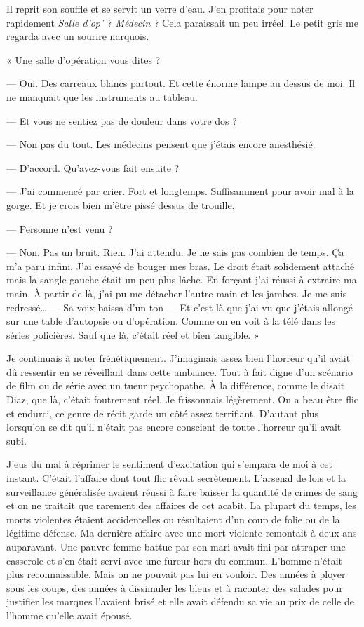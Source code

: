 Il reprit son souffle et se servit un verre d'eau. J'en profitais pour noter rapidement \emph{Salle d'op' ? Médecin ?}
Cela paraissait un peu irréel. Le petit gris me regarda avec un sourire narquois.

« Une salle d'opération vous dites ?

— Oui. Des carreaux blancs partout. Et cette énorme lampe au dessus de moi. Il ne manquait que les instruments au
tableau.

— Et vous ne sentiez pas de douleur dans votre dos ?

— Non pas du tout. Les médecins pensent que j'étais encore anesthésié.

— D'accord. Qu'avez-vous fait ensuite ?

— J'ai commencé par crier. Fort et longtemps. Suffisamment pour avoir mal à la gorge. Et je crois bien m'être pissé
dessus de trouille.

— Personne n'est venu ?

— Non. Pas un bruit. Rien. J'ai attendu. Je ne sais pas combien de temps. Ça m'a paru infini. J'ai essayé de bouger mes
bras. Le droit était solidement attaché mais la sangle gauche était un peu plus lâche. En forçant j'ai réussi à
extraire ma main. À partir de là, j'ai pu me détacher l'autre main et les jambes. Je me suis redressé… — Sa voix baissa
d'un ton — Et c'est là que j'ai vu que j'étais allongé sur une table d'autopsie ou d'opération. Comme on en voit à la
télé dans les séries policières. Sauf que là, c'était réel et bien tangible. »

Je continuais à noter frénétiquement. J'imaginais assez bien l'horreur qu'il avait dû ressentir en se réveillant dans
cette ambiance. Tout à fait digne d'un scénario de film ou de série avec un tueur psychopathe. À la différence, comme
le disait Diaz, que là, c'était foutrement réel. Je frissonnais légèrement. On a beau être flic et endurci, ce genre de
récit garde un côté assez terrifiant. D'autant plus lorsqu'on se dit qu'il n'était pas encore conscient de toute 
l'horreur qu'il avait subi.

J'eus du mal à réprimer le sentiment d'excitation qui s'empara de moi à cet instant. C'était l'affaire dont tout flic 
rêvait secrètement. L'arsenal de lois et la surveillance généralisée avaient réussi à faire baisser la quantité de 
crimes de sang et on ne traitait que rarement des affaires de cet acabit. La plupart du temps, les morts violentes 
étaient accidentelles ou résultaient d'un coup de folie ou de la légitime défense. Ma dernière affaire avec une mort 
violente remontait à deux ans auparavant. Une pauvre femme battue par son mari avait fini par attraper une casserole 
et s'en était servi avec une fureur hors du commun. L'homme n'était plus reconnaissable. Mais on ne pouvait pas lui en 
vouloir. Des années à ployer sous les coups, des années à dissimuler les bleus et à raconter des salades pour justifier 
les marques l'avaient brisé et elle avait défendu sa vie au prix de celle de l'homme qu'elle avait épousé.


